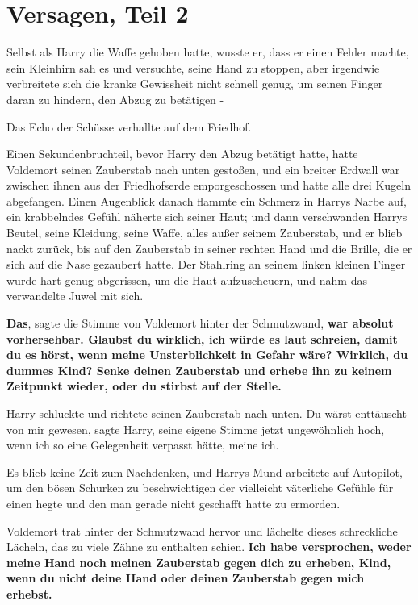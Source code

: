 \chapter{Versagen, Teil 2}

Selbst als Harry die Waffe gehoben hatte, wusste er, dass er einen Fehler
machte, sein Kleinhirn sah es und versuchte, seine Hand zu stoppen, aber
irgendwie verbreitete sich die kranke Gewissheit nicht schnell genug, um seinen
Finger daran zu hindern, den Abzug zu betätigen -

Das Echo der Schüsse verhallte auf dem Friedhof.

Einen Sekundenbruchteil, bevor Harry den Abzug betätigt hatte, hatte Voldemort
seinen Zauberstab nach unten gestoßen, und ein breiter Erdwall war zwischen
ihnen aus der Friedhofserde emporgeschossen und hatte alle drei Kugeln
abgefangen. Einen Augenblick danach flammte ein Schmerz in Harrys Narbe auf, ein
krabbelndes Gefühl näherte sich seiner Haut; und dann verschwanden Harrys
Beutel, seine Kleidung, seine Waffe, alles außer seinem Zauberstab, und er blieb
nackt zurück, bis auf den Zauberstab in seiner rechten Hand und die Brille, die
er sich auf die Nase gezaubert hatte. Der Stahlring an seinem linken kleinen
Finger wurde hart genug abgerissen, um die Haut aufzuscheuern, und nahm das
verwandelte Juwel mit sich.

\glqq \textbf{Das}\grqq{}, sagte die Stimme von Voldemort hinter der
Schmutzwand, \glqq \textbf{war absolut vorhersehbar. Glaubst du wirklich, ich
würde es laut schreien, damit du es hörst, wenn meine Unsterblichkeit in Gefahr
wäre? Wirklich, du dummes Kind? Senke deinen Zauberstab und erhebe ihn zu keinem
Zeitpunkt wieder, oder du stirbst auf der Stelle.}\grqq{}

Harry schluckte und richtete seinen Zauberstab nach unten. \glqq Du wärst
enttäuscht von mir gewesen\grqq{}, sagte Harry, seine eigene Stimme jetzt
ungewöhnlich hoch, \glqq wenn ich so eine Gelegenheit verpasst hätte, meine
ich.\grqq{}

Es blieb keine Zeit zum Nachdenken, und Harrys Mund arbeitete auf Autopilot, um
den bösen Schurken zu beschwichtigen der vielleicht väterliche Gefühle für einen
hegte und den man gerade nicht geschafft hatte zu ermorden.

Voldemort trat hinter der Schmutzwand hervor und lächelte dieses schreckliche
Lächeln, das zu viele Zähne zu enthalten schien. \glqq \textbf{Ich habe
versprochen, weder meine Hand noch meinen Zauberstab gegen dich zu erheben,
Kind, wenn du nicht deine Hand oder deinen Zauberstab gegen mich
erhebst.}\grqq{}

